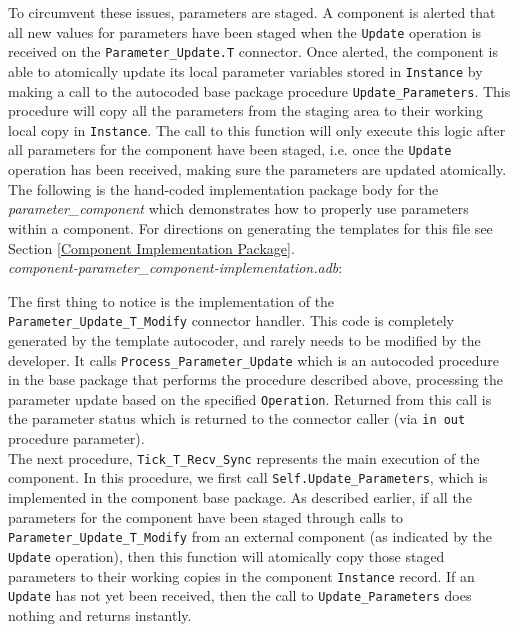To circumvent these issues, parameters are staged. A component is alerted that all new values for parameters have been staged when the \texttt{Update} operation is received on the \texttt{Parameter\_Update.T} connector. Once alerted, the component is able to atomically update its local parameter variables stored in \texttt{Instance} by making a call to the autocoded base package procedure \texttt{Update\_Parameters}. This procedure will copy all the parameters from the staging area to their working local copy in \texttt{Instance}. The call to this function will only execute this logic after all parameters for the component have been staged, i.e. once the \texttt{Update} operation has been received, making sure the parameters are updated atomically. \\

The following is the hand-coded implementation package body for the \textit{parameter\_component} which demonstrates how to properly use parameters within a component. For directions on generating the templates for this file see Section \ref{Component Implementation Package}. \\

\textit{component-parameter\_component-implementation.adb}:

The first thing to notice is the implementation of the \texttt{Parameter\_Update\_T\_Modify} connector handler. This code is completely generated by the template autocoder, and rarely needs to be modified by the developer. It calls \texttt{Process\_Parameter\_Update} which is an autocoded procedure in the base package that performs the procedure described above, processing the parameter update based on the specified \texttt{Operation}. Returned from this call is the parameter status which is returned to the connector caller (via \texttt{in out} procedure parameter). \\

The next procedure, \texttt{Tick\_T\_Recv\_Sync} represents the main execution of the component. In this procedure, we first call \texttt{Self.Update\_Parameters}, which is implemented in the component base package. As described earlier, if all the parameters for the component have been staged through calls to \texttt{Parameter\_Update\_T\_Modify} from an external component (as indicated by the \texttt{Update} operation), then this function will atomically copy those staged parameters to their working copies in the component \texttt{Instance} record. If an \texttt{Update} has not yet been received, then the call to \texttt{Update\_Parameters} does nothing and returns instantly. \\

